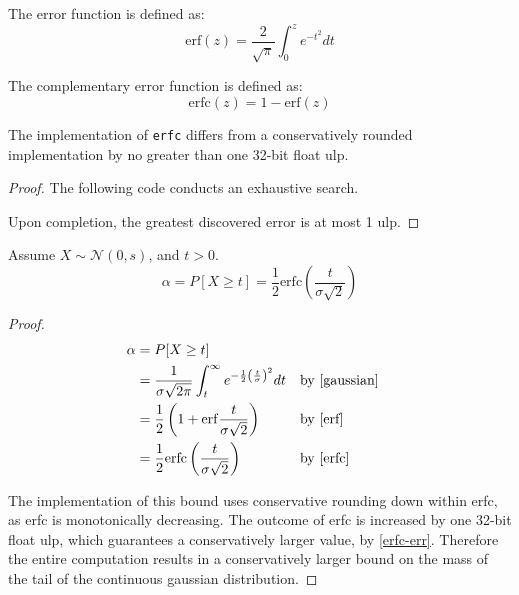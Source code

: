 \documentclass{article}
\begin{document}
\begin{definition} 
    \label{erf} 
    The error function is defined as: 
    \begin{equation} 
        \mathrm{erf}(z) = \frac{2}{\sqrt{\pi}} \int_{0}^{z} e^{-t^2} dt 
    \end{equation} 
\end{definition} 
 
\begin{definition} 
    \label{erfc} 
    The complementary error function is defined as: 
    \begin{equation} 
        \mathrm{erfc}(z) = 1 - \mathrm{erf}(z) 
    \end{equation} 
\end{definition} 
 
\begin{lemma} 
    \label{erfc-err} 
    The implementation of \texttt{erfc} differs from a conservatively rounded implementation by no greater than one 32-bit float ulp. 
\end{lemma} 
 
\begin{proof} 
    The following code conducts an exhaustive search. 
    \label{sec:erfc-err-check} 
     
 
    Upon completion, the greatest discovered error is at most 1 ulp. 
\end{proof} 
 
\begin{theorem} 
    Assume $X \sim \mathcal{N}(0, s)$, and $t > 0$. 
    \begin{equation} 
        \alpha = P[X \ge t] = \frac{1}{2} \mathrm{erfc}\left(\frac{t}{\sigma \sqrt{2}}\right) 
    \end{equation} 
\end{theorem} 
 
\begin{proof} 
    \begin{align*} 
        \alpha &= P[X \ge t] \\ 
        &= \frac{1}{\sigma \sqrt{2 \pi}} \int_{t}^{\infty} e^{-\frac{1}{2}\left( \frac{t}{\sigma}\right)^2} dt && \text{by } \ref{gaussian} \\ 
        &= \frac{1}{2} \left(1 + \mathrm{erf}\frac{t}{\sigma \sqrt{2}}\right) && \text{by } \ref{erf} \\ 
        &= \frac{1}{2} \mathrm{erfc}\left(\frac{t}{\sigma \sqrt{2}}\right) && \text{by } \ref{erfc} 
    \end{align*} 
 
    The implementation of this bound uses conservative rounding down within erfc, as erfc is monotonically decreasing. 
    The outcome of erfc is increased by one 32-bit float ulp, which guarantees a conservatively larger value, by \ref{erfc-err}. 
    Therefore the entire computation results in a conservatively larger bound on the mass of the tail of the continuous gaussian distribution. 
\end{proof} 
 
\end{document}

